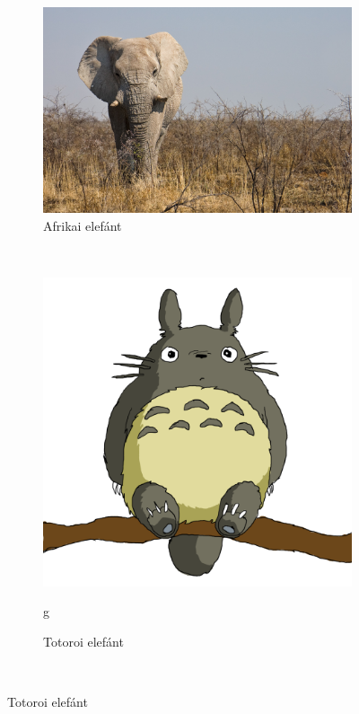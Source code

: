 \documentclass[a4paper]{article}
\begin{document}
\begin{figure}
\centering
\begin{subfigure}[t]{0.3\textwidth}
\centering
\includegraphics[width=\textwidth]{elefant.jpg}
\caption{Afrikai elefánt}
\end{subfigure}\\
\begin{subfigure}[t]{0.3\textwidth}
\centering
\includegraphics[width=\textwidth]{totoro.png}
\caption{Totoroi elefánt}g
\end{subfigure}\\

\end{figure}
\end{document}
